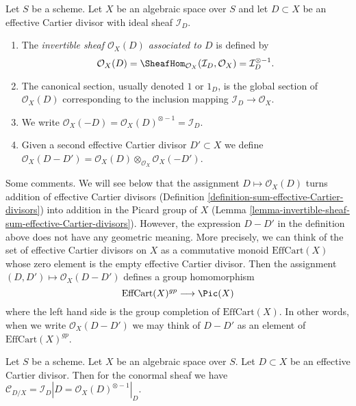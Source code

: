 \begin{definition}
\label{definition-invertible-sheaf-effective-Cartier-divisor}
Let $S$ be a scheme. Let $X$ be an algebraic space over $S$
and let $D \subset X$ be an effective Cartier divisor with ideal
sheaf $\mathcal{I}_D$.
\begin{enumerate}
\item The {\it invertible sheaf $\mathcal{O}_X(D)$ associated to $D$}
is defined by
$$
\mathcal{O}_X(D) =
\SheafHom_{\mathcal{O}_X}(\mathcal{I}_D, \mathcal{O}_X) =
\mathcal{I}_D^{\otimes -1}.
$$
\item The canonical section, usually denoted $1$ or $1_D$, is the
global section of $\mathcal{O}_X(D)$ corresponding to
the inclusion mapping $\mathcal{I}_D \to \mathcal{O}_X$.
\item We write
$\mathcal{O}_X(-D) = \mathcal{O}_X(D)^{\otimes -1} = \mathcal{I}_D$.
\item Given a second effective Cartier divisor $D' \subset X$ we define
$\mathcal{O}_X(D - D') =
\mathcal{O}_X(D) \otimes_{\mathcal{O}_X} \mathcal{O}_X(-D')$.
\end{enumerate}
\end{definition}

\noindent
Some comments. We will see below that the assignment
$D \mapsto \mathcal{O}_X(D)$ turns addition of effective Cartier
divisors (Definition \ref{definition-sum-effective-Cartier-divisors})
into addition in the Picard group of $X$
(Lemma \ref{lemma-invertible-sheaf-sum-effective-Cartier-divisors}).
However, the expression $D - D'$ in the definition above does not
have any geometric meaning. More precisely, we can think of the
set of effective Cartier divisors on $X$ as a commutative monoid
$\text{EffCart}(X)$ whose zero element is the empty effective Cartier divisor.
Then the assignment $(D, D') \mapsto \mathcal{O}_X(D - D')$ defines
a group homomorphism
$$
\text{EffCart}(X)^{gp} \longrightarrow \Pic(X)
$$
where the left hand side is the group completion of
$\text{EffCart}(X)$. In other words, when we write $\mathcal{O}_X(D - D')$
we may think of $D - D'$ as an element of $\text{EffCart}(X)^{gp}$.

\begin{lemma}
\label{lemma-conormal-effective-Cartier-divisor}
Let $S$ be a scheme. Let $X$ be an algebraic space over $S$.
Let $D \subset X$ be an effective Cartier divisor.
Then for the conormal sheaf we have $\mathcal{C}_{D/X} = \mathcal{I}_D|D =
\mathcal{O}_X(D)^{\otimes -1}|_D$.
\end{lemma}

